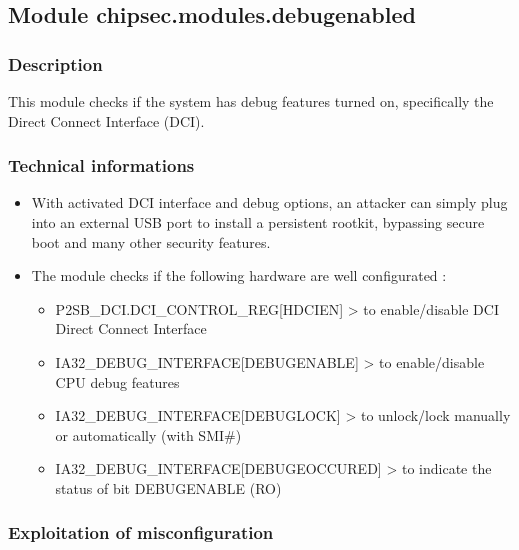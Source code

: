 \hypertarget{module-chipsec.modules.debugenabled}{%
\subsection{Module
chipsec.modules.debugenabled}\label{module-chipsec.modules.debugenabled}}

\hypertarget{description-21}{%
\subsubsection{Description}\label{description-21}}

This module checks if the system has debug features turned on,
specifically the Direct Connect Interface (DCI).

\hypertarget{technical-informations-20}{%
\subsubsection{Technical informations}\label{technical-informations-20}}

\begin{itemize}
\tightlist
\item
  With activated DCI interface and debug options, an attacker can simply
  plug into an external USB port to install a persistent rootkit,
  bypassing secure boot and many other security features.
\item
  The module checks if the following hardware are well configurated :

  \begin{itemize}
  \tightlist
  \item
    P2SB\_DCI.DCI\_CONTROL\_REG{[}HDCIEN{]} \textgreater{} to
    enable/disable DCI Direct Connect Interface
  \item
    IA32\_DEBUG\_INTERFACE{[}DEBUGENABLE{]} \textgreater{} to
    enable/disable CPU debug features
  \item
    IA32\_DEBUG\_INTERFACE{[}DEBUGLOCK{]} \textgreater{} to unlock/lock
    manually or automatically (with SMI\#)
  \item
    IA32\_DEBUG\_INTERFACE{[}DEBUGEOCCURED{]} \textgreater{} to indicate
    the status of bit DEBUGENABLE (RO)
  \end{itemize}
\end{itemize}

\hypertarget{exploitation-of-misconfiguration-5}{%
\subsubsection{Exploitation of
misconfiguration}\label{exploitation-of-misconfiguration-5}}

